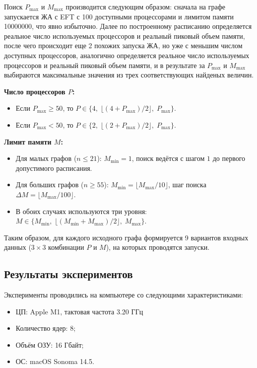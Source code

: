 Поиск $P_{\max}$ и $M_{\max}$ производится следующим образом: сначала на графе запускается ЖА с EFT с 100 доступными процессорами и лимитом памяти 10000000, что явно избыточно. Далее по построенному расписанию определяется реальное число используемых процессоров и реальный пиковый объем памяти, после чего происходит еще 2 похожих запуска ЖА, но уже с меньшим числом доступных процессоров, аналогично определяется реальное число используемых процессоров и реальный пиковый объем памяти, и в результате за $P_{\max}$ и $M_{\max}$ выбираются максимальные значения из трех соответствующих найденых величин.

\noindent \textbf{Число процессоров $P$:}
\begin{itemize}
	\item Если $P_{\max} \ge 50$, то $P \in \{4,\; \lfloor(4+P_{\max})/2\rfloor,\; P_{\max}\}$.
	\item Если $P_{\max} < 50$, то $P \in \{2,\; \lfloor(2+P_{\max})/2\rfloor,\; P_{\max}\}$.
\end{itemize}

\noindent \textbf{Лимит памяти $M$:}
\begin{itemize}
	\item Для малых графов ($n \le 21$): $M_{\min}=1$, поиск ведётся с шагом $1$ до первого допустимого расписания.
	\item Для больших графов ($n \ge 55$): $M_{\min} = \lfloor M_{\max}/10\rfloor$, шаг поиска $\Delta M = \lfloor M_{\max}/100\rfloor$.
	\item В обоих случаях используются три уровня: $M \in \{M_{\min},\; \lfloor(M_{\min}+M_{\max})/2\rfloor,\; M_{\max}\}$.
\end{itemize}

Таким образом, для каждого исходного графа формируется 9 вариантов входных данных ($3\times3$ комбинации $P$ и $M$), на которых проводятся запуски.

\subsection{Результаты экспериментов}

Эксперименты проводились на компьютере со следующими характеристиками:
\begin{itemize}
	\item ЦП: Apple M1, тактовая частота 3.20 ГГц
	\item Количество ядер: 8;
	\item Объём ОЗУ: 16 Гбайт;
	\item ОС: macOS Sonoma 14.5.
\end{itemize}

